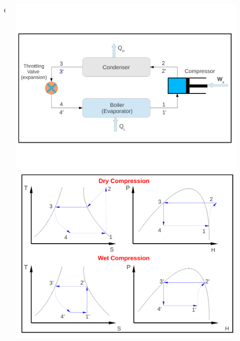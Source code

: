 \documentclass[10pt,compress]{beamer}
\newcommand{\frc}{\displaystyle\frac}
\begin{document}
\begin{frame}
\begin{columns}
\begin{column}[c]{0.6\linewidth}
\begin{enumerate}[(1)]
\begin{enumerate}[(a)]
{\begin{eqnarray}
                && COP^{\text{(wet)}} = \frc{h_{1^{\prime}}-h_{4^{\prime}}}{h_{2^{\prime}}-h_{1^{\prime}}} \nonumber
             \end{eqnarray}}
         \end{enumerate}
     \end{enumerate}
   \end{column}  
   \begin{column}[c]{0.4\linewidth}
     \vbox{
      \hbox{\includegraphics[width=.9\columnwidth]{./Pics/Overview_Refrig12}}
      \hbox{\includegraphics[width=.9\columnwidth]{./Pics/Overview_Refrig13}}}
   \end{column}  

\end{columns}
\end{frame}
 
\end{document}
